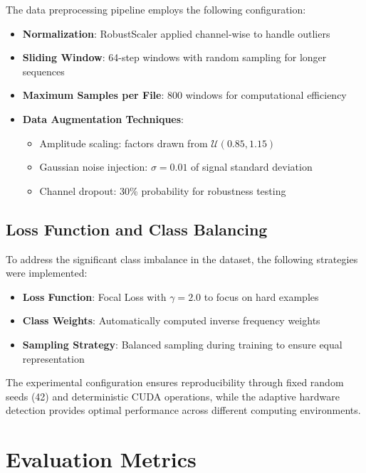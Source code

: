 The data preprocessing pipeline employs the following configuration:

\begin{itemize}
    \item \textbf{Normalization}: RobustScaler applied channel-wise to handle outliers
    \item \textbf{Sliding Window}: 64-step windows with random sampling for longer sequences
    \item \textbf{Maximum Samples per File}: 800 windows for computational efficiency
    \item \textbf{Data Augmentation Techniques}:
    \begin{itemize}
        \item Amplitude scaling: factors drawn from $\mathcal{U}(0.85, 1.15)$
        \item Gaussian noise injection: $\sigma = 0.01$ of signal standard deviation
        \item Channel dropout: 30\% probability for robustness testing
    \end{itemize}
\end{itemize}

\subsection{Loss Function and Class Balancing}
\label{subsec:loss_class_balancing}

To address the significant class imbalance in the dataset, the following strategies were implemented:

\begin{itemize}
    \item \textbf{Loss Function}: Focal Loss with $\gamma = 2.0$ to focus on hard examples
    \item \textbf{Class Weights}: Automatically computed inverse frequency weights
    \item \textbf{Sampling Strategy}: Balanced sampling during training to ensure equal representation
\end{itemize}

The experimental configuration ensures reproducibility through fixed random seeds (42) and deterministic CUDA operations, while the adaptive hardware detection provides optimal performance across different computing environments.

\section{Evaluation Metrics}
\label{sec:experiments:metrics}


